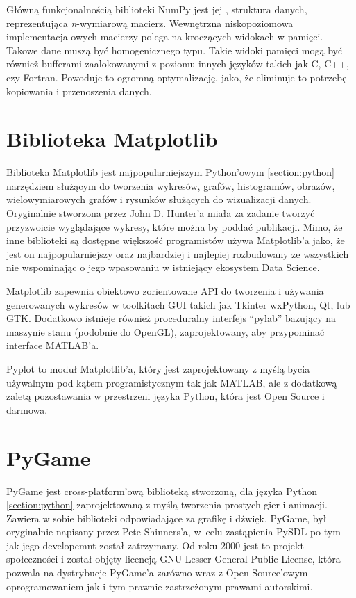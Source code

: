 Główną funkcjonalnością biblioteki NumPy jest jej , struktura danych, reprezentująca \textit{n}-wymiarową macierz. Wewnętrzna niskopoziomowa implementacja owych macierzy polega na kroczących widokach w pamięci. Takowe dane muszą być homogenicznego typu. Takie widoki pamięci mogą być również bufferami zaalokowanymi z poziomu innych języków takich jak C, C++, czy Fortran. Powoduje to ogromną optymalizację, jako, że eliminuje to potrzebę kopiowania i przenoszenia danych.



\section{Biblioteka Matplotlib}
\label{section:matplotlib}

Biblioteka Matplotlib \cite{MatplotlibDocumentation} \cite{Matplotlib30Cookbook} \cite{PythonForDataAnalysis} \cite{WikipediaMatplotlib} jest najpopularniejszym Python'owym \ref{section:python} narzędziem służącym do tworzenia wykresów, grafów, histogramów, obrazów, wielowymiarowych grafów i rysunków służących do wizualizacji danych. Oryginalnie stworzona przez John D. Hunter'a miała za zadanie tworzyć przyzwoicie wyglądające wykresy, które można by poddać publikacji. Mimo, że inne biblioteki są dostępne większość programistów używa Matplotlib'a jako, że jest on najpopularniejszy oraz najbardziej i najlepiej rozbudowany ze wszystkich nie wspominając o jego wpasowaniu w istniejący ekosystem Data Science.

Matplotlib zapewnia obiektowo zorientowane API do tworzenia i używania generowanych wykresów w toolkitach GUI takich jak Tkinter wxPython, Qt, lub GTK. Dodatkowo istnieje również proceduralny interfejs ``pylab'' bazujący na maszynie stanu (podobnie do OpenGL), zaprojektowany, aby przypominać interface MATLAB'a.

Pyplot to moduł Matplotlib'a, który jest zaprojektowany z myślą bycia używalnym pod kątem programistycznym tak jak MATLAB, ale z dodatkową zaletą pozostawania w przestrzeni języka Python, która jest Open Source i darmowa.


\section{PyGame}
\label{section:pygame}

PyGame \cite{PyGameDocumentation} \cite{WikipediaPyGame} jest cross-platform'ową biblioteką stworzoną, dla języka Python \ref{section:python} zaprojektowaną z myślą tworzenia prostych gier i animacji. Zawiera w sobie biblioteki odpowiadające za grafikę i dźwięk.
PyGame, był oryginalnie napisany przez Pete Shinners'a, w~celu zastąpienia PySDL po tym jak jego developemnt został zatrzymany. Od roku 2000 jest to projekt społeczności i został objęty licencją GNU Lesser General Public License, która pozwala na dystrybucje PyGame'a zarówno wraz z Open Source'owym oprogramowaniem jak i tym prawnie zastrzeżonym prawami autorskimi.




